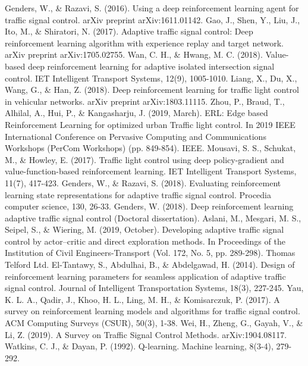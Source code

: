 \documentclass{article}
\begin{document}
\begin{thebibliography}{00}
 Genders, W., \& Razavi, S. (2016). Using a deep reinforcement learning agent for traffic signal control. arXiv preprint arXiv:1611.01142.
 Gao, J., Shen, Y., Liu, J., Ito, M., \& Shiratori, N. (2017). Adaptive traffic signal control: Deep reinforcement learning algorithm with experience replay and target network. arXiv preprint arXiv:1705.02755.
 Wan, C. H., \& Hwang, M. C. (2018). Value-based deep reinforcement learning for adaptive isolated intersection signal control. IET Intelligent Transport Systems, 12(9), 1005-1010.
 Liang, X., Du, X., Wang, G., \& Han, Z. (2018). Deep reinforcement learning for traffic light control in vehicular networks. arXiv preprint arXiv:1803.11115.
 Zhou, P., Braud, T., Alhilal, A., Hui, P., \& Kangasharju, J. (2019, March). ERL: Edge based Reinforcement Learning for optimized urban Traffic light control. In 2019 IEEE International Conference on Pervasive Computing and Communications Workshops (PerCom Workshops) (pp. 849-854). IEEE.
 Mousavi, S. S., Schukat, M., \& Howley, E. (2017). Traffic light control using deep policy-gradient and value-function-based reinforcement learning. IET Intelligent Transport Systems, 11(7), 417-423.
 Genders, W., \& Razavi, S. (2018). Evaluating reinforcement learning state representations for adaptive traffic signal control. Procedia computer science, 130, 26-33.
 Genders, W. (2018). Deep reinforcement learning adaptive traffic signal control (Doctoral dissertation).
 Aslani, M., Mesgari, M. S., Seipel, S., \& Wiering, M. (2019, October). Developing adaptive traffic signal control by actor–critic and direct exploration methods. In Proceedings of the Institution of Civil Engineers-Transport (Vol. 172, No. 5, pp. 289-298). Thomas Telford Ltd.
 El-Tantawy, S., Abdulhai, B., \& Abdelgawad, H. (2014). Design of reinforcement learning parameters for seamless application of adaptive traffic signal control. Journal of Intelligent Transportation Systems, 18(3), 227-245.
 Yau, K. L. A., Qadir, J., Khoo, H. L., Ling, M. H., \& Komisarczuk, P. (2017). A survey on reinforcement learning models and algorithms for traffic signal control. ACM Computing Surveys (CSUR), 50(3), 1-38.
 Wei, H., Zheng, G., Gayah, V., \& Li, Z. (2019). A Survey on Traffic Signal Control Methods. arXiv:1904.08117.
 Watkins, C. J., \& Dayan, P. (1992). Q-learning. Machine learning, 8(3-4), 279-292.

\end{thebibliography}
\end{document}
